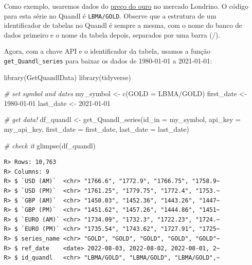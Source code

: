 \documentclass[
  11pt,
]{book}
\newenvironment{Shaded}{\begin{snugshade}}{\end{snugshade}}
\newcommand{\AttributeTok}[1]{\textcolor[rgb]{0.61,0.61,0.61}{#1}}
\newcommand{\CommentTok}[1]{\textcolor[rgb]{0.37,0.37,0.37}{\textit{#1}}}
\newcommand{\FunctionTok}[1]{\textcolor[rgb]{0,0,0}{#1}}
\newcommand{\NormalTok}[1]{#1}
\newcommand{\OtherTok}[1]{\textcolor[rgb]{0.37,0.37,0.37}{#1}}
\newcommand{\StringTok}[1]{\textcolor[rgb]{0.5,0.5,0.5}{#1}}
\begin{document}
Como exemplo, usaremos dados do \href{https://www.quandl.com/data/LBMA/GOLD-Gold-Price-London-Fixing}{preço do ouro} no mercado Londrino. O código para esta série no Quandl é \texttt{\textquotesingle{}LBMA/GOLD\textquotesingle{}}. Observe que a estrutura de um identificador de tabelas no Quandl é sempre a mesma, com o nome do banco de dados primeiro e o nome da tabela depois, separados por uma barra (/).

Agora, com a chave API e o identificador da tabela, usamos a função \texttt{get\_Quandl\_series} para baixar os dados de 1980-01-01 a 2021-01-01:  

\begin{Shaded}
\begin{Highlighting}[]
\FunctionTok{library}\NormalTok{(GetQuandlData)}
\FunctionTok{library}\NormalTok{(tidyverse)}

\CommentTok{\# set symbol and dates}
\NormalTok{my\_symbol }\OtherTok{\textless{}{-}} \FunctionTok{c}\NormalTok{(}\StringTok{\textquotesingle{}GOLD\textquotesingle{}} \OtherTok{=} \StringTok{\textquotesingle{}LBMA/GOLD\textquotesingle{}}\NormalTok{)}
\NormalTok{first\_date }\OtherTok{\textless{}{-}} \StringTok{\textquotesingle{}1980{-}01{-}01\textquotesingle{}}
\NormalTok{last\_date }\OtherTok{\textless{}{-}} \StringTok{\textquotesingle{}2021{-}01{-}01\textquotesingle{}}

\CommentTok{\# get data!}
\NormalTok{df\_quandl }\OtherTok{\textless{}{-}} \FunctionTok{get\_Quandl\_series}\NormalTok{(}\AttributeTok{id\_in =}\NormalTok{ my\_symbol,}
                               \AttributeTok{api\_key =}\NormalTok{ my\_api\_key, }
                               \AttributeTok{first\_date =}\NormalTok{ first\_date,}
                               \AttributeTok{last\_date =}\NormalTok{ last\_date)}

\CommentTok{\# check it}
\FunctionTok{glimpse}\NormalTok{(df\_quandl)}
\end{Highlighting}
\end{Shaded}

\begin{verbatim}
R> Rows: 10,763
R> Columns: 9
R> $ `USD (AM)`  <chr> "1766.6", "1772.9", "1766.75", "1758.9~
R> $ `USD (PM)`  <chr> "1761.25", "1779.75", "1772.4", "1753.~
R> $ `GBP (AM)`  <chr> "1450.03", "1452.36", "1443.26", "1447~
R> $ `GBP (PM)`  <chr> "1451.62", "1457.26", "1444.86", "1451~
R> $ `EURO (AM)` <chr> "1734.09", "1732.3", "1722.23", "1724.~
R> $ `EURO (PM)` <chr> "1735.54", "1743.62", "1727.91", "1725~
R> $ series_name <chr> "GOLD", "GOLD", "GOLD", "GOLD", "GOLD"~
R> $ ref_date    <date> 2022-08-03, 2022-08-02, 2022-08-01, 2~
R> $ id_quandl   <chr> "LBMA/GOLD", "LBMA/GOLD", "LBMA/GOLD",~
\end{verbatim}
\end{document}
